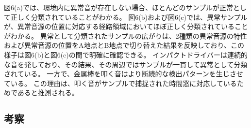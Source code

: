 \documentclass[../main]{subfiles}
\begin{document}
図6(a)では、環境内に異常音が存在しない場合、ほとんどのサンプルが正常として正しく分類されていることがわかる。
図6(b)および図6(c)では、異常サンプルが、異常音源の位置に対応する経路領域においてほぼ正しく分類されていることがわかる。
異常として分類されたサンプルの広がりは、2種類の異常音源の特性および異常音源の位置をA地点とB地点で切り替えた結果を反映しており、この様子は図6(b)と図6(c)の間で明確に確認できる。
インパクトドライバーは連続的な音を発しており、その結果、その周辺ではサンプルが一貫して異常として分類されている。
一方で、金属棒を叩く音はより断続的な検出パターンを生じさせている。
この理由は、叩く音がサンプルで捕捉された時間窓に対応しているためであると推測される。
\subsection{考察}
\end{document}

